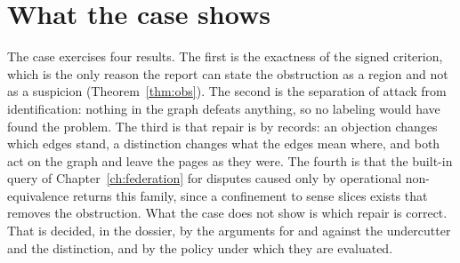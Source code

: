 \section{What the case shows}\label{sec:case1lessons}

The case exercises four results. The first is the exactness of the signed criterion, which is the only reason the report can state the obstruction as a region and not as a suspicion (Theorem~\ref{thm:obs}). The second is the separation of attack from identification: nothing in the graph defeats anything, so no labeling would have found the problem. The third is that repair is by records: an objection changes which edges stand, a distinction changes what the edges mean where, and both act on the graph and leave the pages as they were. The fourth is that the built-in query of Chapter~\ref{ch:federation} for disputes caused only by operational non-equivalence returns this family, since a confinement to sense slices exists that removes the obstruction. What the case does not show is which repair is correct. That is decided, in the dossier, by the arguments for and against the undercutter and the distinction, and by the policy under which they are evaluated.

